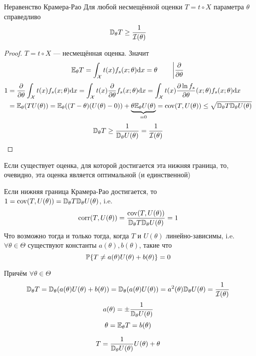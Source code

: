 \begin{thm}{Неравенство Крамера-Рао}
Для любой несмещённой оценки $T=t\circ X$ параметра $\theta$ справедливо
$$\mathbb D_\theta T \geq \frac{1}{\mathcal I(\theta)}$$
\end{thm}
\begin{proof}
$T=t\circ X$ --- несмещённая оценка. Значит
$$\mathbb E_\theta T = \int_\mathcal X t(x)f_s(x;\theta) \mathrm d x = \theta
\qquad \left|\frac\partial{\partial\theta}\right.$$
$$\begin{aligned}
1
&=\frac\partial{\partial\theta}\int_\mathcal X t(x)f_s(x;\theta)\mathrm d x
 = \int_\mathcal X t(x) \frac\partial{\partial\theta} f_s(x;\theta)\mathrm d x
 = \int_\mathcal X t(x) \frac{\partial\ln f_s}{\partial\theta}(x;\theta)f_s(x;\theta)\mathrm d x \\
&= \mathbb E_\theta(T U(\theta)) = \mathbb E_\theta((T - \theta)(U(\theta)-0)) + \underbrace{\theta\mathbb E_\theta U(\theta)}_{=0}
 = \mathrm{cov}(T,U(\theta))
 \leq \sqrt{\mathbb D_\theta T \mathbb D_\theta U(\theta)}
\end{aligned}$$
$$\mathbb D_\theta T \geq \frac{1}{\mathbb D_\theta U(\theta)} = \frac{1}{\mathcal I(\theta)}$$
\end{proof}

Если существует оценка, для которой достигается эта нижняя граница,
то, очевидно, эта оценка является оптимальной (и единственной)

\begin{thm}
Если нижняя граница Крамера-Рао достигается,
то ${1 = \mathrm{cov}(T,U(\theta)) = \mathbb D_\theta T \mathbb D_\theta U(\theta)}$,
i.e. $$\mathrm{corr}(T,U(\theta)) = \frac{\mathrm{cov}(T,U(\theta))}{\mathbb D_\theta T \mathbb D_\theta U(\theta)} = 1$$
Что возможно тогда и только тогда, когда $T$ и $U(\theta)$ линейно-зависимы,
i.e. $\forall\theta\in\Theta$ существуют константы $a(\theta), b(\theta)$, такие что
$$\mathbb P\{T \neq a(\theta) U(\theta) + b(\theta)\} = 0$$

Причём $\forall\theta\in\Theta$
$$\mathbb D_\theta T = \mathbb D_\theta(a(\theta)U(\theta) + b(\theta))
= \mathbb D_\theta(a(\theta) U(\theta)) = a^2(\theta) \mathbb D_\theta U(\theta) 
= \frac{1}{\mathcal I(\theta)}$$
$$a(\theta) = \pm\frac{1}{\mathbb D_\theta U(\theta)}$$
$$\theta=\mathbb E_\theta T = b(\theta)$$

$$T = \frac{1}{\mathbb D_\theta U(\theta)}U(\theta) + \theta$$
\end{thm}

